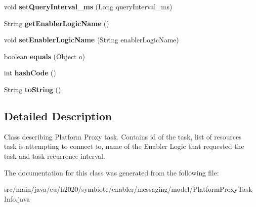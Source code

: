 \begin{DoxyCompactItemize}
void {\bfseries set\+Query\+Interval\+\_\+ms} (Long query\+Interval\+\_\+ms)
\item 
\mbox{\label{classeu_1_1h2020_1_1symbiote_1_1enabler_1_1messaging_1_1model_1_1PlatformProxyTaskInfo_a77e09f36dd08c7d1138575e98d3dde0d}} 
String {\bfseries get\+Enabler\+Logic\+Name} ()
\item 
\mbox{\label{classeu_1_1h2020_1_1symbiote_1_1enabler_1_1messaging_1_1model_1_1PlatformProxyTaskInfo_a8d70ff06cf859bef6f2e6a8914042d64}} 
void {\bfseries set\+Enabler\+Logic\+Name} (String enabler\+Logic\+Name)
\item 
\mbox{\label{classeu_1_1h2020_1_1symbiote_1_1enabler_1_1messaging_1_1model_1_1PlatformProxyTaskInfo_ac342dfc48eec90f6ef4c031633c322ad}} 
boolean {\bfseries equals} (Object o)
\item 
\mbox{\label{classeu_1_1h2020_1_1symbiote_1_1enabler_1_1messaging_1_1model_1_1PlatformProxyTaskInfo_a3960cebd10629c0a850dcb383d4e8e92}} 
int {\bfseries hash\+Code} ()
\item 
\mbox{\label{classeu_1_1h2020_1_1symbiote_1_1enabler_1_1messaging_1_1model_1_1PlatformProxyTaskInfo_aef9d945cc69d385395cb12de058fbadc}} 
String {\bfseries to\+String} ()
\end{DoxyCompactItemize}


\subsection{Detailed Description}
Class describing Platform Proxy task. Contains id of the task, list of resources task is attempting to connect to, name of the Enabler Logic that requested the task and task recurrence interval. 

The documentation for this class was generated from the following file\+:\begin{DoxyCompactItemize}
\item 
src/main/java/eu/h2020/symbiote/enabler/messaging/model/Platform\+Proxy\+Task\+Info.\+java\end{DoxyCompactItemize}
